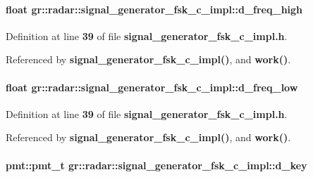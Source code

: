 \paragraph[{d\+\_\+freq\+\_\+high}]{\setlength{\rightskip}{0pt plus 5cm}float gr\+::radar\+::signal\+\_\+generator\+\_\+fsk\+\_\+c\+\_\+impl\+::d\+\_\+freq\+\_\+high}\label{classgr_1_1radar_1_1signal__generator__fsk__c__impl_a57c10c8f10299bd2a5b4cdcf0185903d}


Definition at line {\bf 39} of file {\bf signal\+\_\+generator\+\_\+fsk\+\_\+c\+\_\+impl.\+h}.



Referenced by {\bf signal\+\_\+generator\+\_\+fsk\+\_\+c\+\_\+impl()}, and {\bf work()}.

\paragraph[{d\+\_\+freq\+\_\+low}]{\setlength{\rightskip}{0pt plus 5cm}float gr\+::radar\+::signal\+\_\+generator\+\_\+fsk\+\_\+c\+\_\+impl\+::d\+\_\+freq\+\_\+low}\label{classgr_1_1radar_1_1signal__generator__fsk__c__impl_aee18688b203ef59700b60d51a8253557}


Definition at line {\bf 39} of file {\bf signal\+\_\+generator\+\_\+fsk\+\_\+c\+\_\+impl.\+h}.



Referenced by {\bf signal\+\_\+generator\+\_\+fsk\+\_\+c\+\_\+impl()}, and {\bf work()}.

\paragraph[{d\+\_\+key}]{\setlength{\rightskip}{0pt plus 5cm}pmt\+::pmt\+\_\+t gr\+::radar\+::signal\+\_\+generator\+\_\+fsk\+\_\+c\+\_\+impl\+::d\+\_\+key}\label{classgr_1_1radar_1_1signal__generator__fsk__c__impl_a36791f26f8b156d1c98c59271cea7167}


